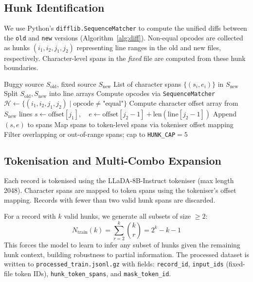 \documentclass[11pt,a4paper]{article}
\begin{document}
\subsection{Hunk Identification}

We use Python's \texttt{difflib.SequenceMatcher} to compute the unified diffs between the \texttt{old} and \texttt{new} versions (Algorithm~\ref{alg:diff}). Non-equal opcodes are collected as hunks \((i_1, i_2, j_1, j_2)\) representing line ranges in the old and new files, respectively. Character-level spans in the \emph{fixed} file are computed from these hunk boundaries.

\begin{algorithm}[H]
\caption{Hunk Span Extraction}
\label{alg:diff}
\begin{algorithmic}[1]
\Require Buggy source $S_{\text{old}}$, fixed source $S_{\text{new}}$
\Ensure List of character spans $\{(s_i, e_i)\}$ in $S_{\text{new}}$
\State Split $S_{\text{old}}, S_{\text{new}}$ into line arrays
\State Compute opcodes via \texttt{SequenceMatcher}
\State $\mathcal{H} \gets \{(i_1,i_2,j_1,j_2) \mid \text{opcode} \neq \text{"equal"}\}$
\State Compute character offset array from $S_{\text{new}}$ lines
  \State $s \gets \text{offset}[j_1],\quad e \gets \text{offset}[j_2{-}1] + \text{len}(\text{line}[j_2{-}1])$
  \State Append $(s, e)$ to spans
\EndFor
\State Map spans to token-level spans via tokeniser offset mapping
\State Filter overlapping or out-of-range spans; cap to \texttt{HUNK\_CAP}$=5$
\end{algorithmic}
\end{algorithm}

\subsection{Tokenisation and Multi-Combo Expansion}

Each record is tokenised using the LLaDA-8B-Instruct tokeniser (max length 2048). Character spans are mapped to token spans using the tokeniser's offset mapping. Records with fewer than two valid hunk spans are discarded.

For a record with $k$ valid hunks, we generate all subsets of size $\geq 2$:
\[
  N_{\text{train}}(k) = \sum_{r=2}^{k} \binom{k}{r} = 2^k - k - 1
\]
This forces the model to learn to infer any subset of hunks given the remaining hunk context, building robustness to partial information. The processed dataset is written to \texttt{processed\_train.jsonl.gz} with fields: \texttt{record\_id}, \texttt{input\_ids} (fixed-file token IDs), \texttt{hunk\_token\_spans}, and \texttt{mask\_token\_id}.
\end{document}
